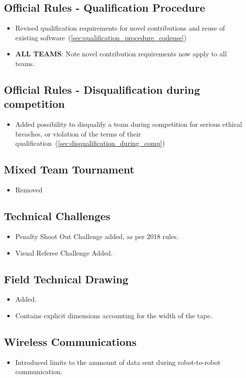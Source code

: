 \subsection*{Official Rules - Qualification Procedure}
\begin{itemize}
  \item Revised qualification requirements for novel contributions and reuse of existing software~(\cf \cref{sec:qualification_procedure_codeuse})
  \item \textbf{ALL TEAMS}: Note novel contribution requirements now apply to all teams.
\end{itemize}


\subsection*{Official Rules - Disqualification during competition}
\begin{itemize}
  \item Added possibility to disqualify a team during competition for serious ethical breaches, or violation of the terms of their qualification~(\cf \cref{sec:disqualification_during_comp})
\end{itemize}

\subsection*{Mixed Team Tournament}
\begin{itemize}
  \item Removed
\end{itemize}

\subsection*{Technical Challenges}
\begin{itemize}
  \item Penalty Shoot Out Challenge added, as per 2018 rules.
  \item Visual Referee Challenge Added.
\end{itemize}

\subsection*{Field Technical Drawing}
\begin{itemize}
  \item Added.
  \item Contains explicit dimensions accounting for the width of the tape.
\end{itemize}

\subsection*{Wireless Communications}
\begin{itemize}
  \item Introduced limits to the ammount of data sent during robot-to-robot communication.
\end{itemize}
